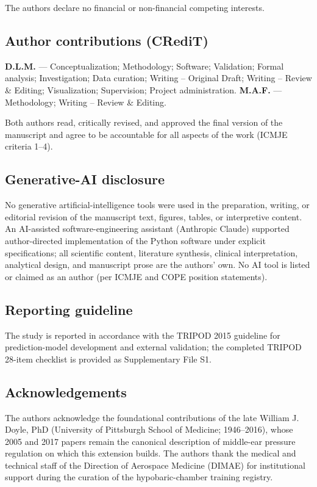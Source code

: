 \documentclass[11pt,a4paper]{article}
\begin{document}
The authors declare no financial or non-financial competing interests.

\subsection{Author contributions (CRediT)}

\textbf{D.L.M.} --- Conceptualization; Methodology; Software; Validation; Formal analysis; Investigation; Data curation; Writing -- Original Draft; Writing -- Review \& Editing; Visualization; Supervision; Project administration.
\textbf{M.A.F.} --- Methodology; Writing -- Review \& Editing.

Both authors read, critically revised, and approved the final version of the manuscript and agree to be accountable for all aspects of the work (ICMJE criteria 1--4).

\subsection{Generative-AI disclosure}

No generative artificial-intelligence tools were used in the preparation, writing, or editorial revision of the manuscript text, figures, tables, or interpretive content. An AI-assisted software-engineering assistant (Anthropic Claude) supported author-directed implementation of the Python software under explicit specifications; all scientific content, literature synthesis, clinical interpretation, analytical design, and manuscript prose are the authors' own. No AI tool is listed or claimed as an author (per ICMJE and COPE position statements).

\subsection{Reporting guideline}

The study is reported in accordance with the TRIPOD 2015 guideline for prediction-model development and external validation; the completed TRIPOD 28-item checklist is provided as Supplementary File S1.

\subsection{Acknowledgements}

The authors acknowledge the foundational contributions of the late William J. Doyle, PhD (University of Pittsburgh School of Medicine; 1946--2016), whose 2005 and 2017 papers remain the canonical description of middle-ear pressure regulation on which this extension builds. The authors thank the medical and technical staff of the Direction of Aerospace Medicine (DIMAE) for institutional support during the curation of the hypobaric-chamber training registry.
\end{document}
